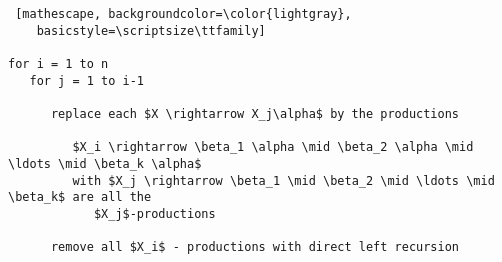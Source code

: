 \documentclass[
    border=0.2cm,
    convert={density=600}
]{standalone}
\begin{document}
\begin{lstlisting} [mathescape, backgroundcolor=\color{lightgray},
	basicstyle=\scriptsize\ttfamily]

for i = 1 to n
   for j = 1 to i-1
      
      replace each $X \rightarrow X_j\alpha$ by the productions
            
         $X_i \rightarrow \beta_1 \alpha \mid \beta_2 \alpha \mid \ldots \mid \beta_k \alpha$
         with $X_j \rightarrow \beta_1 \mid \beta_2 \mid \ldots \mid \beta_k$ are all the
            $X_j$-productions

      remove all $X_i$ - productions with direct left recursion
      
\end{lstlisting}
\end{document}
